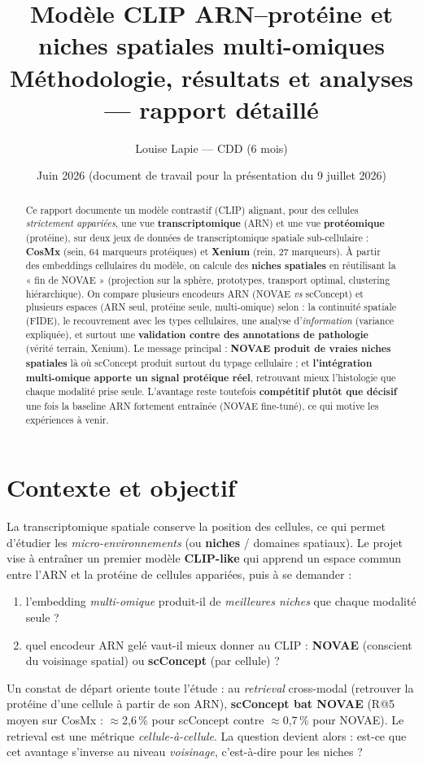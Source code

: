 \documentclass[11pt,a4paper]{article}
\title{\textbf{Modèle CLIP ARN--protéine et niches spatiales multi-omiques}\\[4pt]
\large Méthodologie, résultats et analyses --- rapport détaillé}
\author{Louise Lapie --- CDD (6 mois)}
\date{Juin 2026 \quad(document de travail pour la présentation du 9 juillet 2026)}
\begin{document}
\maketitle

\begin{abstract}
\noindent
Ce rapport documente un modèle contrastif (CLIP) alignant, pour des cellules
\emph{strictement appariées}, une vue \textbf{transcriptomique} (ARN) et une vue
\textbf{protéomique} (protéine), sur deux jeux de données de transcriptomique spatiale
sub-cellulaire : \textbf{CosMx} (sein, 64 marqueurs protéiques) et \textbf{Xenium}
(rein, 27 marqueurs). À partir des embeddings cellulaires du modèle, on calcule des
\textbf{niches spatiales} en réutilisant la « fin de NOVAE » (projection sur la sphère,
prototypes, transport optimal, clustering hiérarchique). On compare plusieurs encodeurs
ARN (NOVAE \emph{vs} scConcept) et plusieurs espaces (ARN seul, protéine seule,
multi-omique) selon : la continuité spatiale (FIDE), le recouvrement avec les types
cellulaires, une analyse d'\emph{information} (variance expliquée), et surtout une
\textbf{validation contre des annotations de pathologie} (vérité terrain, Xenium).
Le message principal : \textbf{NOVAE produit de vraies niches spatiales} là où scConcept
produit surtout du typage cellulaire ; et \textbf{l'intégration multi-omique apporte un
signal protéique réel}, retrouvant mieux l'histologie que chaque modalité prise seule.
L'avantage reste toutefois \textbf{compétitif plutôt que décisif} une fois la baseline
ARN fortement entraînée (NOVAE fine-tuné), ce qui motive les expériences à venir.
\end{abstract}

\tableofcontents
\bigskip

\section{Contexte et objectif}
La transcriptomique spatiale conserve la position des cellules, ce qui permet d'étudier
les \emph{micro-environnements} (ou \textbf{niches} / domaines spatiaux). Le projet vise
à entraîner un premier modèle \textbf{CLIP-like} qui apprend un espace commun entre l'ARN
et la protéine de cellules appariées, puis à se demander :
\begin{enumerate}[noitemsep]
  \item l'embedding \emph{multi-omique} produit-il de \emph{meilleures niches} que chaque
        modalité seule ?
  \item quel encodeur ARN gelé vaut-il mieux donner au CLIP : \textbf{NOVAE} (conscient du
        voisinage spatial) ou \textbf{scConcept} (par cellule) ?
\end{enumerate}
Un constat de départ oriente toute l'étude : au \emph{retrieval} cross-modal (retrouver la
protéine d'une cellule à partir de son ARN), \textbf{scConcept bat NOVAE}
(R@5 moyen sur CosMx : $\approx$2{,}6\,\% pour scConcept contre $\approx$0{,}7\,\% pour
NOVAE). Le retrieval est une métrique \emph{cellule-à-cellule}. La question devient alors :
est-ce que cet avantage s'inverse au niveau \emph{voisinage}, c'est-à-dire pour les niches ?
\end{document}
